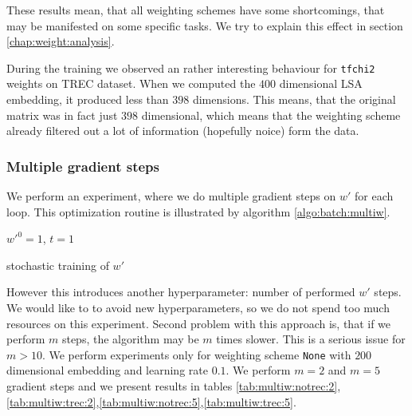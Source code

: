     These results mean, that all weighting schemes have some shortcomings, 
    that may be manifested on some specific tasks.  
    We try to explain this effect in section \ref{chap:weight:analysis}.
    
    During the training we observed an rather interesting behaviour for \texttt{tfchi2} weights on TREC dataset.
    When we computed the $400$ dimensional LSA embedding, it produced less than $398$ dimensions. 
    This means, that the original matrix was in fact just $398$ dimensional, 
    which means that the weighting scheme already filtered out a lot of information (hopefully noice) form the data. 

    \subsubsection{Multiple gradient steps}
    
    We perform an experiment, where we do multiple gradient steps on $w'$ for each loop. 
    This optimization routine is illustrated by algorithm \ref{algo:batch:multiw}.
    
    \begin{algorithm}[H]
        $w'^0 = 1$, $t=1$\;
        \caption{stochastic training of $w'$} \label{algo:batch:multiw}
    \end{algorithm}
    
    However this introduces another hyperparameter: number of performed $w'$ steps.
    We would like to to avoid new hyperparameters, so we do not spend too much resources on this experiment.
    Second problem with this approach is, that if we perform $m$ steps, the algorithm may be $m$ times slower. 
    This is a serious issue for $m>10$. 
    We perform experiments only for weighting scheme \texttt{None} with $200$ dimensional embedding and learning rate $0.1$.
    We perform $m=2$ and $m=5$ gradient steps and we present results in tables \ref{tab:multiw:notrec:2},
    \ref{tab:multiw:trec:2},\ref{tab:multiw:notrec:5},\ref{tab:multiw:trec:5}.
    
